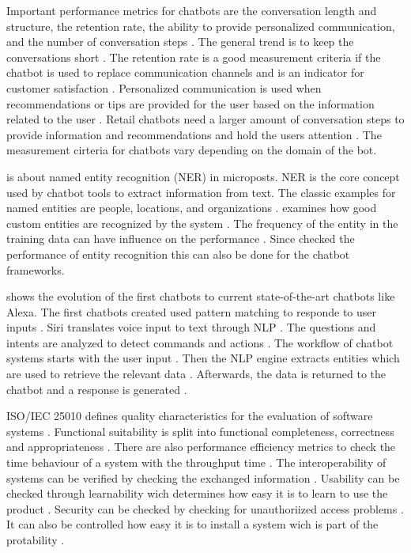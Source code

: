 \documentclass[12pt, backref]{report}
\begin{document}
Important performance metrics for chatbots are the conversation length and structure, the retention rate, the ability to provide personalized communication, and the number of conversation steps \cite{PRZEGALINSKA2019785}.
The general trend is to keep the conversations short \cite{PRZEGALINSKA2019785}.
The retention rate is a good measurement criteria if the chatbot is used to replace communication channels and is an indicator for customer satisfaction \cite{PRZEGALINSKA2019785}.
Personalized communication is used when recommendations or tips are provided for the user based on the information related to the user \cite{PRZEGALINSKA2019785}.
Retail chatbots need a larger amount of conversation steps to provide information and recommendations and hold the users attention \cite{PRZEGALINSKA2019785}.
The measurement cirteria for chatbots vary depending on the domain of the bot.

\citet{geyer2016named} is about named entity recognition (NER) in microposts.
NER is the core concept used by chatbot tools to extract information from text.
The classic examples for named entities are people, locations, and organizations \cite{geyer2016named}.
\citet{geyer2016named} examines how good custom entities are recognized by the system \citet{geyer2016named}.
The frequency of the entity in the training data can have influence on the performance \cite{geyer2016named}. 
Since \citet{geyer2016named} checked the performance of entity recognition this can also be done for the chatbot frameworks.

\citet{deshpande2017survey} shows the evolution of the first chatbots to current state-of-the-art chatbots like Alexa.
The first chatbots created used pattern matching to responde to user inputs \cite{deshpande2017survey}.
Siri translates voice input to text through NLP \cite{deshpande2017survey}. 
The questions and intents are analyzed to detect commands and actions \cite{deshpande2017survey}.
The workflow of chatbot systems starts with the user input \cite{deshpande2017survey}. 
Then the NLP engine extracts entities which are used to retrieve the relevant data \cite{deshpande2017survey}.
Afterwards, the data is returned to the chatbot and a response is generated \cite{deshpande2017survey}.



ISO/IEC 25010 defines quality characteristics for the evaluation of software systems \cite{iso25010}.
Functional suitability is split into functional completeness, correctness and appropriateness \cite{iso25010}.
There are also performance efficiency metrics to check the time behaviour of a system with the throughput time \cite{iso25010}.
The interoperability of systems can be verified by checking the exchanged information \cite{iso25010}.
Usability can be checked through learnability wich determines how easy it is to learn to use the product \cite{iso25010}.
Security can be checked by checking for unauthoriized access problems \cite{iso25010}.
It can also be controlled how easy it is to install a system wich is part of the protability \cite{iso25010}.
\end{document}
